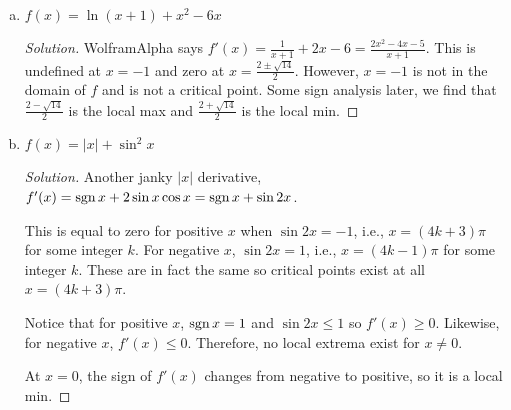 \begin{enumerate}[(a)]
  \item $f(x) = \ln(x+1) + x^2 - 6x$
        \begin{proof}[Solution]
          WolframAlpha says $f'(x) = \frac{1}{x+1} + 2x - 6 = \frac{2x^2 - 4x - 5}{x+1}$.
          This is undefined at $x=-1$ and zero at $x=\frac{2\pm\sqrt{14}}{2}$.
          However, $x=-1$ is not in the domain of $f$ and is not a critical point.
          Some sign analysis later, we find that $\frac{2-\sqrt{14}}{2}$ is the local max
          and $\frac{2+\sqrt{14}}{2}$ is the local min.
        \end{proof}
  \item $f(x) = |x|+\sin^2 x$
        \begin{proof}[Solution]
          Another janky $|x|$ derivative, $f'(x) = \operatorname{sgn} x + 2\sin x \cos x = \operatorname{sgn} x + \sin 2x$.

          This is equal to zero for positive $x$ when $\sin 2x = -1$, i.e., $x = (4k+3)\pi$ for some integer $k$.
          For negative $x$, $\sin 2x = 1$, i.e., $x = (4k-1)\pi$ for some integer $k$.
          These are in fact the same so critical points exist at all $x = (4k+3)\pi$.

          Notice that for positive $x$, $\operatorname{sgn} x = 1$ and $\sin 2x \leq 1$ so $f'(x) \geq 0$.
          Likewise, for negative $x$, $f'(x) \leq 0$.
          Therefore, no local extrema exist for $x \neq 0$.

          At $x = 0$, the sign of $f'(x)$ changes from negative to positive, so it is a local min.
        \end{proof}
\end{enumerate}


